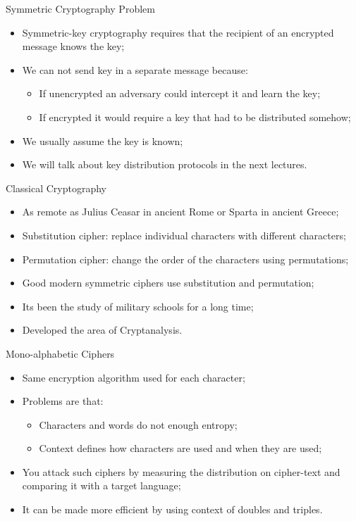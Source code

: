 \documentclass[12pt]{beamer}
\begin{document}
\begin{frame}{Symmetric Cryptography Problem}
\begin{itemize}
\item Symmetric-key cryptography requires that the recipient of an encrypted message knows the key;\pause
\item We can not send key in a separate message because:\pause
\begin{itemize}
\item If unencrypted an adversary could intercept it and learn the key;\pause
\item If encrypted it would require a key that had to be distributed somehow;\pause
\end{itemize} 
\item We usually assume the key is known;\pause
\item We will talk about key distribution protocols in the next lectures.
\end{itemize}
\end{frame}

\begin{frame}{Classical Cryptography}
\begin{itemize}
\item As remote as Julius Ceasar in ancient Rome or Sparta in ancient Greece;\pause
\item Substitution cipher: replace individual characters with different characters;\pause
\item Permutation cipher: change the order of the characters using permutations;\pause
\item Good modern symmetric ciphers use substitution and permutation;\pause
\item Its been the study of military schools for a long time;\pause
\item Developed the area of Cryptanalysis.
\end{itemize}
\end{frame}

\begin{frame}{Mono-alphabetic Ciphers}
\begin{itemize}
\item Same encryption algorithm used for each character;\pause
\item Problems are that:\pause
\begin{itemize}
\item Characters and words do not enough entropy;\pause
\item Context defines how characters are used and when they are used;\pause
\end{itemize}
\item You attack such ciphers by measuring the distribution on cipher-text and comparing it with a target language;\pause
\item It can be made more efficient by using context of doubles and triples.
\end{itemize}
\end{frame}
\end{document}
